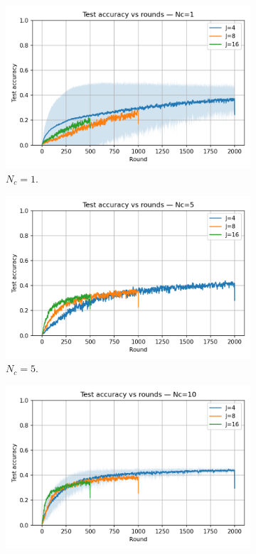 \documentclass[10pt,twocolumn,letterpaper]{article}
\begin{document}
\begin{figure}[H]
  \centering
  \begin{subfigure}[b]{0.32\linewidth}
    \centering
    \includegraphics[width=\linewidth]{heter_figs/acc_vs_rounds_Nc_1.png}
    \caption{\(N_c=1\).}
  \end{subfigure}
  \hfill
  \begin{subfigure}[b]{0.32\linewidth}
    \centering
    \includegraphics[width=\linewidth]{heter_figs/acc_vs_rounds_Nc_5.png}
    \caption{\(N_c=5\).}
  \end{subfigure}
  \hfill
  \begin{subfigure}[b]{0.32\linewidth}
    \centering
    \includegraphics[width=\linewidth]{heter_figs/acc_vs_rounds_Nc_10.png}

\end{subfigure}
\end{figure}
\end{document}
